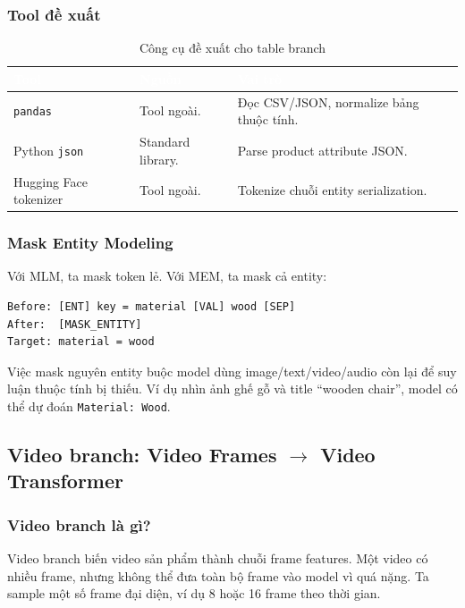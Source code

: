\documentclass[12pt,a4paper]{article}
\begin{document}
\subsubsection{Tool đề xuất}
\begin{table}[htbp]
\centering
\begin{tabularx}{\linewidth}{@{}L{4cm}L{3.4cm}Y@{}}
\toprule
{}
\textcolor{white}{\textbf{Tool}} & \textcolor{white}{\textbf{Nguồn}} & \textcolor{white}{\textbf{Vai trò}} \\
\midrule
\texttt{pandas} & Tool ngoài. & Đọc CSV/JSON, normalize bảng thuộc tính. \\
Python \texttt{json} & Standard library. & Parse product attribute JSON. \\
Hugging Face tokenizer & Tool ngoài. & Tokenize chuỗi entity serialization. \\
\bottomrule
\end{tabularx}
\caption{Công cụ đề xuất cho table branch}
\end{table}

\subsubsection{Mask Entity Modeling}
Với MLM, ta mask token lẻ. Với MEM, ta mask cả entity:

\begin{lstlisting}
Before: [ENT] key = material [VAL] wood [SEP]
After:  [MASK_ENTITY]
Target: material = wood
\end{lstlisting}

Việc mask nguyên entity buộc model dùng image/text/video/audio còn lại để suy luận thuộc tính bị thiếu. Ví dụ nhìn ảnh ghế gỗ và title ``wooden chair'', model có thể dự đoán \texttt{Material: Wood}.

\subsection{Video branch: Video Frames $\to$ Video Transformer}

\subsubsection{Video branch là gì?}
Video branch biến video sản phẩm thành chuỗi frame features. Một video có nhiều frame, nhưng không thể đưa toàn bộ frame vào model vì quá nặng. Ta sample một số frame đại diện, ví dụ 8 hoặc 16 frame theo thời gian.
\end{document}
